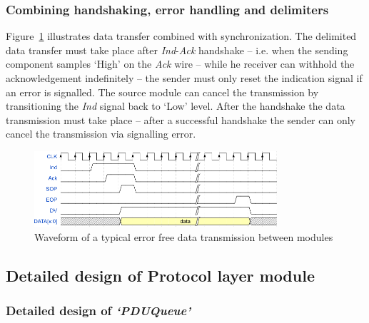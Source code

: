 \documentclass[conference]{IEEEtran}
\begin{document}
\subsubsection{Combining handshaking, error handling and delimiters}

Figure~\ref{fig:data_signals} illustrates data transfer combined with synchronization. The delimited data transfer must take place after \emph{Ind}-\emph{Ack} handshake -- i.e. when the sending component samples `High' on the \emph{Ack} wire --  while he receiver can withhold the acknowledgement indefinitely -- the sender must only reset the indication signal if an error is signalled. The source module can cancel the transmission by transitioning the \emph{Ind} signal back to `Low' level. After the handshake the data transmission must take place -- after a successful handshake the sender can only cancel the transmission via signalling error.

\begin{figure}[!htb]
    \centering
    \includegraphics[width=9cm]{figures_raw/data_signals.png}
    \caption{Waveform of a typical error free data transmission between modules}
    \label{fig:data_signals}
\end{figure}


\subsection{Detailed design of Protocol layer module}

\subsubsection{Detailed design of \emph{`PDUQueue'}}\label{subsubsec:PDUQueue_details}
\end{document}
